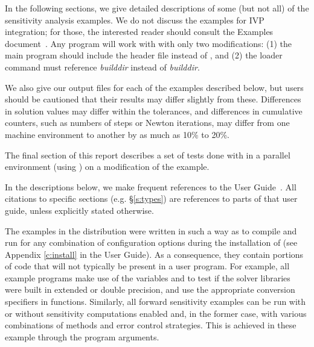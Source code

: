 
\vspace{0.2in}\noindent
In the following sections, we give detailed descriptions of some (but
not all) of the sensitivity analysis examples. We do not discuss the 
examples for IVP integration; for those, the interested reader should consult
the {\cvode} Examples document~\cite{cvode_ex}. Any {\cvode} program
will work with {\cvodes} with only two modifications: (1) the main program
should include the header file  instead of , and
(2) the loader command must reference
{\em builddir} instead of
{\em builddir}.

We also give our output files for each of the examples described below, 
but users should be cautioned that their
results may differ slightly from these.  Differences in solution
values may differ within the tolerances, and differences in cumulative
counters, such as numbers of steps or Newton iterations, may differ
from one machine environment to another by as much as 10\% to 20\%.

The final section of this report describes a set of tests done with
{\cvodes} in a parallel environment (using {\nvecp}) on a modification of
the  example.

In the descriptions below, we make frequent references to the {\cvodes}
User Guide~\cite{cvodes_ug}.  All citations to specific sections
(e.g. \S\ref{s:types}) are references to parts of that user guide, unless
explicitly stated otherwise.

\vspace{0.2in}
The examples in the {\cvodes} distribution were written in such a way as
to compile and run for any combination of configuration options during
the installation of {\sundials} (see Appendix \ref{c:install} in the User Guide).
As a consequence, they contain portions of code that will not typically be present in a
user program. For example, all example programs make use of the
variables  and 
to test if the solver libraries
were built in extended or double precision, and use the appropriate conversion 
specifiers in  functions. Similarly, all forward sensitivity
examples can be run with or without sensitivity computations enabled and,
in the former case, with various combinations of methods and error control 
strategies. This is achieved in these example through the program arguments.

